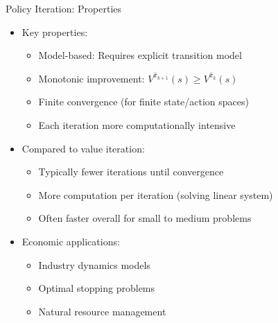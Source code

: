 \documentclass[10pt]{beamer}
\begin{document}
\begin{frame}{Policy Iteration: Properties}
    \begin{itemize}
        \item Key properties:
        \begin{itemize}
            \item Model-based: Requires explicit transition model
            \item Monotonic improvement: $V^{\hat{\pi}_{k+1}}(s) \geq V^{\hat{\pi}_k}(s)$
            \item Finite convergence (for finite state/action spaces)
            \item Each iteration more computationally intensive
        \end{itemize}
        \vspace{0.2cm}
        \item Compared to value iteration:
        \begin{itemize}
            \item Typically fewer iterations until convergence
            \item More computation per iteration (solving linear system)
            \item Often faster overall for small to medium problems
        \end{itemize}
        \vspace{0.2cm}
        \item Economic applications:
        \begin{itemize}
            \item Industry dynamics models
            \item Optimal stopping problems
            \item Natural resource management
        \end{itemize}
    \end{itemize}
\end{frame}

\end{document}
